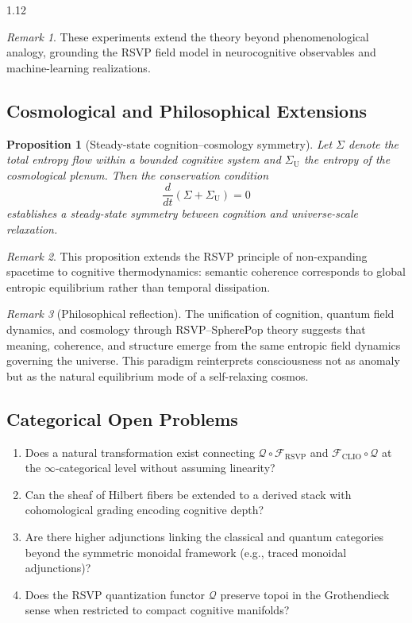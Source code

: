 \documentclass[12pt,a4paper]{article}
\numberwithin{equation}{section}
\newtheorem{proposition}{Proposition}[section]
\theoremstyle{remark}
\newtheorem{remark}{Remark}[section]
\theoremstyle{definition}
\begin{document}
\begin{spacing}{1.12}
\begin{remark}
These experiments extend the theory beyond phenomenological analogy, grounding the RSVP field model in neurocognitive observables and machine-learning realizations.
\end{remark}

\subsection{Cosmological and Philosophical Extensions}\label{sec:I-cosmo}

\begin{proposition}[Steady-state cognition–cosmology symmetry]\label{prop:I-steadystate}
Let $\Sigma$ denote the total entropy flow within a bounded cognitive system and $\Sigma_\text{U}$ the entropy of the cosmological plenum.  
Then the conservation condition
\[
\frac{d}{dt}(\Sigma + \Sigma_\text{U}) = 0
\]
establishes a steady-state symmetry between cognition and universe-scale relaxation.
\end{proposition}

\begin{remark}
This proposition extends the RSVP principle of non-expanding spacetime to cognitive thermodynamics: semantic coherence corresponds to global entropic equilibrium rather than temporal dissipation.
\end{remark}

\begin{remark}[Philosophical reflection]
The unification of cognition, quantum field dynamics, and cosmology through RSVP–SpherePop theory suggests that meaning, coherence, and structure emerge from the same entropic field dynamics governing the universe.  
This paradigm reinterprets consciousness not as anomaly but as the natural equilibrium mode of a self-relaxing cosmos.
\end{remark}

\subsection{Categorical Open Problems}\label{sec:I-cat}

\begin{enumerate}[label=\textbf{Q\arabic*.}]
\item Does a natural transformation exist connecting $\mathcal{Q}\circ \mathcal{F}_{\mathrm{RSVP}}$ and $\mathcal{F}_{\mathrm{CLIO}}\circ\mathcal{Q}$ at the $\infty$-categorical level without assuming linearity?
\item Can the sheaf of Hilbert fibers be extended to a derived stack with cohomological grading encoding cognitive depth?
\item Are there higher adjunctions linking the classical and quantum categories beyond the symmetric monoidal framework (e.g., traced monoidal adjunctions)?
\item Does the RSVP quantization functor $\mathcal{Q}$ preserve topoi in the Grothendieck sense when restricted to compact cognitive manifolds?
\end{enumerate}


\end{spacing}
\end{document}
